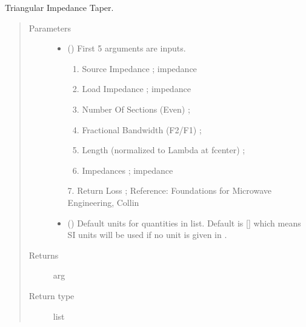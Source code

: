 \documentclass[letterpaper,10pt,english]{sphinxmanual}
\begin{document}

\begin{fulllineitems}
\label{\detokenize{components:components.Triangular_Taper_Impedance_Transformer}}
Triangular Impedance Taper.
\begin{quote}\begin{description}
\item[{Parameters}] \leavevmode\begin{itemize}
\item {} 
 () \textendash{} 
First 5 arguments are inputs.
\begin{enumerate}
%
\item {} 
Source Impedance ; impedance

\item {} 
Load Impedance ; impedance

\item {} 
Number Of Sections (Even) ;

\item {} 
Fractional Bandwidth (F2/F1) ;

\item {} 
Length (normalized to Lambda at fcenter) ;

\item {} 
Impedances ; impedance

\end{enumerate}

7.  Return Loss ;
Reference:  Foundations for Microwave Engineering, Collin


\item {} 
 (\sphinxstyleliteralemphasis{\sphinxupquote{, }}) \textendash{} Default units for quantities in  list. Default is {[}{]} which means SI units will be used if no unit is given in .

\end{itemize}

\item[{Returns}] \leavevmode
arg

\item[{Return type}] \leavevmode
list

\end{description}\end{quote}

\end{fulllineitems}
\end{document}

